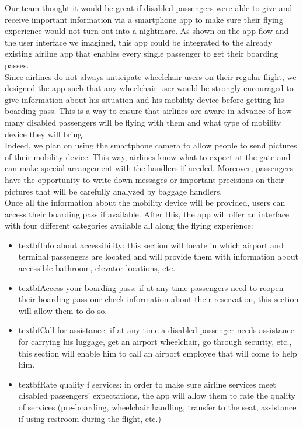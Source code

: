 \newpage

Our team thought it would be great if disabled passengers were able to give and receive important information via a smartphone app to make sure their flying experience would not turn out into a nightmare. As shown on the app flow and the user interface we imagined, this app could be integrated to the already existing airline app that enables every single passenger to get their boarding passes.\\

Since airlines do not always anticipate wheelchair users on their regular flight, we designed the app such that any wheelchair user would be strongly encouraged to give information about his situation and his mobility device before getting his boarding pass. This is a way to ensure that airlines are aware in advance of how many disabled passengers will be flying with them and what type of mobility device they will bring.\\

Indeed, we plan on using the smartphone camera to allow people to send pictures of their mobility device. This way, airlines know what to expect at the gate and can make special arrangement with the handlers if needed. Moreover, passengers have the opportunity to write down messages or important precisions on their pictures that will be carefully analyzed by baggage handlers.\\
Once all the information about the mobility device will be provided, users can access their boarding pass if available. After this, the app will offer an interface with four different categories available all along the flying experience:

\begin{itemize}

\item textbf{Info about accessibility:} this section will locate in which airport and terminal passengers are located and will provide them with information about accessible bathroom, elevator locations, etc.

\item textbf{Access your boarding pass:} if at any time passengers need to reopen their boarding pass our check information about their reservation, this section will allow them to do so.

\item textbf{Call for assistance:} if at any time a disabled passenger needs assistance for carrying his luggage, get an airport wheelchair, go through security, etc., this section will enable him to call an airport employee that will come to help him.

\item textbf{Rate quality f services:} in order to make sure airline services meet disabled passengers’ expectations, the app will allow them to rate the quality of services (pre-boarding, wheelchair handling, transfer to the seat, assistance if using restroom during the flight, etc.)


\end{itemize}
